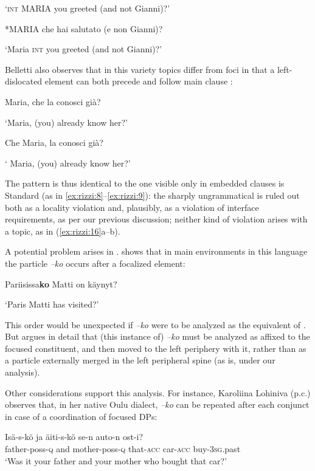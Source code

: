 \documentclass[output=paper]{LSP/langsci}
\begin{document}
\glt ‘\textsc{int} MARIA you greeted (and not Gianni)?’ 

   \ex \label{ex:rizzi:15b} *MARIA che hai salutato (e non Gianni)?

 \glt ‘Maria \textsc{int} you greeted (and not Gianni)?’
\z
\z

Belletti also observes that in this variety topics differ from foci in that a  left-dislocated element can both precede and follow main clause :

\ea%
    \label{ex:rizzi:16}
\ea    Maria, che la conosci già? ~~

 \glt ‘Maria,  (you) already know her?’

   \ex  Che Maria, la conosci già?

 \glt ‘ Maria, (you) already know her?'
\z
\z

The pattern is thus identical to the one visible only in embedded clauses is Standard  (as in \ref{ex:rizzi:8}--\ref{ex:rizzi:9}): the sharply ungrammatical  is ruled out both as a locality violation and, plausibly, as a violation of interface requirements, as per our previous discussion; neither kind of violation arises with a topic, as in (\ref{ex:rizzi:16}a--b).

A potential problem arises in . \citet{Holmberg2013,Holmberg2014finnishquestion} shows that in main environments in this language the  particle \textit{–ko} occurs after a focalized element:

\ea%
    \label{ex:rizzi:17}
   Pariisissa\textbf{ko}   Matti  on   käynyt?

 \glt ‘Paris  Matti has  visited?’
\z

This order would be unexpected if \textit{–ko} were to be analyzed as the  equivalent of . But \citeauthor{Holmberg2014finnishquestion} argues in detail that (this instance of) \textit{–ko} must be analyzed as affixed to the focused constituent, and then moved to the left periphery with it, rather than as a particle externally merged in the left peripheral spine (as  is, under our analysis). 

Other considerations support this analysis. For instance, Karoliina Lohiniva (p.c.)  observes that, in her native Oulu dialect, \textit{–ko} can be repeated after each conjunct in case of a coordination of focused DPs:

\ea%
    \label{ex:rezzi:18}
    \gll Isä-s-kö ja äiti-s-kö se-n auto-n ost-i?\\
         father-poss-\textsc{q} and mother-poss-\textsc{q} that-\textsc{acc} car-\textsc{acc} buy-3\textsc{sg}.past\\
 \glt ‘Was it your father and your mother who bought that car?’
\z
\end{document}
